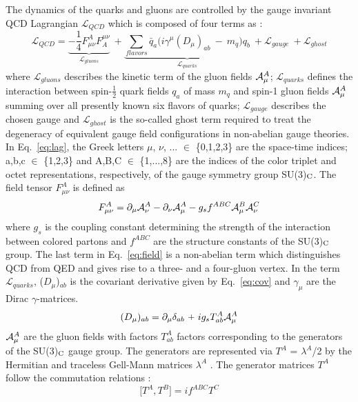 The dynamics of the quarks and gluons are controlled by the gauge invariant QCD Lagrangian $\mathcal{L}_{QCD}$ which is composed of four terms as : 
\begin{equation}
\mathcal{L}_{QCD} = \underbrace{-\frac{1}{4}F^A_{\mu\nu}F^{\mu\nu}_A}_\text{$\mathcal{L}_{gluons}$}~\plus \underbrace{\sum\limits_{flavors}^{} \bar{q}_a \big(i\gamma^\mu (D_\mu)_{ab}~-~m_q\big)q_b}_\text{$\mathcal{L}_{quarks}$}~\plus \mathcal{L}_{gauge}~\plus\mathcal{L}_{ghost}
\label{eq:lag}
\end{equation}
where $\mathcal{L}_{gluons}$ describes the kinetic term of the gluon fields ${\cal A}^A_\mu$; $\mathcal{L}_{quarks}$ defines the interaction between spin-$\frac{1}{2}$ quark fields $q_a$ of mass $m_q$ and spin-1 gluon fields ${\cal A}^A_\mu$ summing over all presently known six flavors of quarks; $\mathcal{L}_{gauge}$ describes the chosen gauge and $\mathcal{L}_{ghost}$ is the so-called ghost term required to treat the degeneracy of equivalent gauge field configurations in non-abelian gauge theories. In Eq.~\ref{eq:lag}, the Greek letters $\mu$, $\nu$, ... $\in$ \{0,1,2,3\} are the space-time indices; a,b,c $\in$ \{1,2,3\} and A,B,C $\in$ \{1,...,8\} are the indices of the color triplet and octet representations, respectively, of the gauge symmetry group SU(3)$_{\rm C}$. The field tensor $F^A_{\mu\nu}$ is defined as
\begin{equation}
F^A_{\mu\nu} = \partial_\mu {\cal A}^A_\nu - \partial_\nu {\cal A}^A_\mu - g_s f^{ABC}{\cal A}^B_\mu {\cal A}^C_\nu
\label{eq:field}
\end{equation}
where $g_s$ is the coupling constant determining the strength of the interaction between colored partons and $f^{ABC}$ are the structure constants of the SU(3)$_{\rm C}$ group. The last term in Eq.~\ref{eq:field} is a non-abelian term which distinguishes QCD from QED and gives rise to a three- and a four-gluon vertex. In the term $\mathcal{L}_{quarks}$, ($D_\mu$)$_{ab}$ is the covariant derivative given by Eq.~\ref{eq:cov} and $\gamma_\mu$ are the Dirac $\gamma$-matrices. 
\begin{equation}
(D_\mu)_{ab} = \partial_{\mu}\delta_{ab}~\plus ig_sT^A_{ab}{\cal A}^A_\mu
\label{eq:cov}
\end{equation}
${\cal A}^A_\mu$ are the gluon fields with factors $T^A_{ab}$ factors corresponding to the generators of the SU(3)$_{\rm C}$ gauge group. The generators are represented via $T^A$ = $\lambda^A$/2 by the Hermitian and traceless Gell-Mann matrices $\lambda^A$ \cite{GellMann:1962xb}. The generator matrices $T^A$ follow the commutation relations :
\begin{equation}
\bigg[T^A,T^B\bigg] = if^{ABC}T^C
\end{equation}

